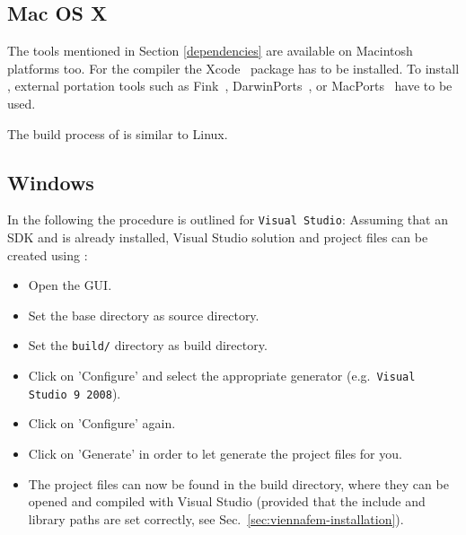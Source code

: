 
\subsection{Mac OS X}
\label{apple}
The tools mentioned in Section \ref{dependencies} are available on
Macintosh platforms too.
For the {\GCC} compiler the Xcode~\cite{xcode} package has to be installed.
To install {\CMake}, external portation tools such as
Fink~\cite{fink}, DarwinPorts~\cite{darwinports},
or MacPorts~\cite{macports} have to be used.

The build process of {\ViennaFEM} is similar to Linux.

\subsection{Windows}
In the following the procedure is outlined for \texttt{Visual Studio}: Assuming
that an {\OpenCL} SDK and {\CMake} is already installed, Visual Studio solution
and project files can be created using {\CMake}:
\begin{itemize}
\item Open the {\CMake} GUI.
\item Set the {\ViennaFEM} base directory as source directory.
\item Set the \texttt{build/} directory as build directory.
\item Click on 'Configure' and select the appropriate generator
(e.g.~\texttt{Visual Studio 9 2008}).
\item Click on 'Configure' again.
\item Click on 'Generate' in order to let {\CMake} generate the project files for you.
\item The project files can now be found in the {\ViennaFEM} build directory,
where they can be opened and compiled with Visual Studio (provided that the
include and library paths are set correctly, see
Sec.~\ref{sec:viennafem-installation}).
\end{itemize}

























